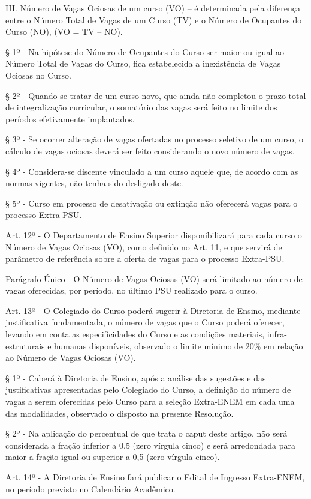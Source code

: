 III. Número de Vagas Ociosas de um curso (VO) – é determinada pela diferença entre o Número Total de Vagas de um Curso (TV) e o Número de Ocupantes do Curso (NO), (VO = TV – NO).


§ 1º - Na hipótese do Número de Ocupantes do Curso ser maior ou igual ao Número Total de Vagas do Curso, fica estabelecida a inexistência de Vagas Ociosas no Curso.

§ 2º - Quando se tratar de um curso novo, que ainda não completou o prazo total de integralização curricular, o somatório das vagas será feito no limite dos períodos efetivamente implantados.

§ 3º - Se ocorrer alteração de vagas ofertadas no processo seletivo de um curso, o cálculo de vagas ociosas deverá ser feito considerando o novo número de vagas.

§ 4º - Considera-se discente vinculado a um curso aquele que, de acordo com as normas vigentes, não tenha sido desligado deste.

§ 5º - Curso em processo de desativação ou extinção não oferecerá vagas para o processo Extra-PSU.

Art. 12º - O Departamento de Ensino Superior disponibilizará para cada curso o Número de Vagas Ociosas (VO), como definido no Art. 11, e que servirá de parâmetro de referência sobre a oferta de vagas para o processo Extra-PSU.

Parágrafo Único - O Número de Vagas Ociosas (VO) será limitado ao número de vagas oferecidas, por período, no último PSU realizado para o curso.

Art. 13º - O Colegiado do Curso poderá sugerir à Diretoria de Ensino, mediante justificativa fundamentada, o número de vagas que o Curso poderá oferecer, levando em conta as especificidades do Curso e as condições materiais, infra-estruturais e humanas disponíveis, observado o limite mínimo de 20\% em relação ao Número de Vagas Ociosas (VO).

§ 1º - Caberá à Diretoria de Ensino, após a análise das sugestões e das justificativas apresentadas pelo Colegiado do Curso, a definição do número de vagas a serem oferecidas pelo Curso para a seleção Extra-ENEM em cada uma das modalidades, observado o disposto na presente Resolução.

§ 2º - Na aplicação do percentual de que trata o caput deste artigo, não será considerada a fração inferior a 0,5 (zero vírgula cinco) e será arredondada para maior a fração igual ou superior a 0,5 (zero vírgula cinco).

Art. 14º - A Diretoria de Ensino fará publicar o Edital de Ingresso Extra-ENEM, no período previsto no Calendário Acadêmico.


